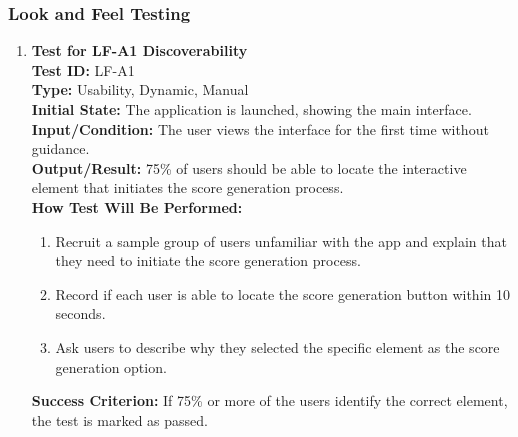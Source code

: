 \documentclass[12pt, titlepage]{article}
\begin{document}
\subsubsection{Look and Feel Testing}
\label{LF}
\begin{enumerate}
    \item \textbf{Test for LF-A1 Discoverability} \\
      \newline
      \textbf{Test ID:} LF-A1 \\
      \textbf{Type:} Usability, Dynamic, Manual \\
      \textbf{Initial State:} The application is launched, showing the main interface. \\
      \textbf{Input/Condition:} The user views the interface for the first time without guidance. \\
      \textbf{Output/Result:} 75\% of users should be able to locate the interactive element that initiates the score generation process. \\
      \textbf{How Test Will Be Performed:}
      \begin{enumerate}
          \item Recruit a sample group of users unfamiliar with the app and explain that they need to initiate the score generation 
          process.
          \item Record if each user is able to locate the score generation button within 10 seconds.
          \item Ask users to describe why they selected the specific element as the score generation option.
      \end{enumerate}
      \textbf{Success Criterion:} If 75\% or more of the users identify the correct element, the test is marked as passed.


\end{enumerate}
\end{document}
